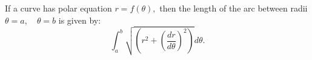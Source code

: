  If a curve has polar equation $ r= f ( \theta ) , $ then the length of
the arc between radii $ \theta = a, \quad \theta = b $ is given by:
\[ \int _a ^b \sqrt { \left ( r^2 + \left ( \frac{dr}{d \theta} \right ) ^2 
\right ) }  d \theta . \]
